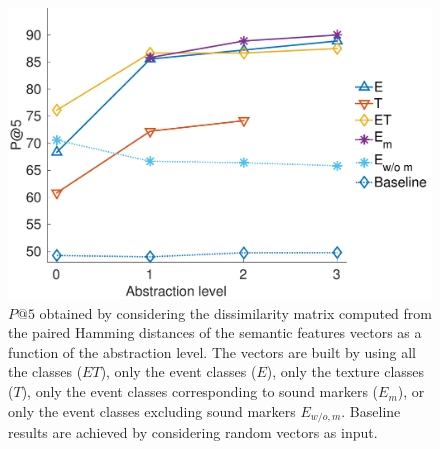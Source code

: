 \documentclass[12pt]{elsarticle}
\newcommand{\cf}{cf.}
\newcommand{\myfloatalign}{\centering}
\begin{document}
\begin{figure}[t]
  \myfloatalign
  \includegraphics[width=\linewidth]{gfx/pa5_1_en}
  \caption{$P@5$ obtained by considering the dissimilarity matrix computed from the paired Hamming distances of the semantic features vectors as a function of the abstraction level. The vectors are built by using all the classes ($ET$), only the event classes ($E$), only the texture classes ($T$), only the event classes corresponding to sound markers ($E_m$), or only the event classes excluding sound markers $E_{w/o,m}$. Baseline results are achieved by considering random vectors as input.}\label{fig:pa5}
\end{figure}

\end{document}
